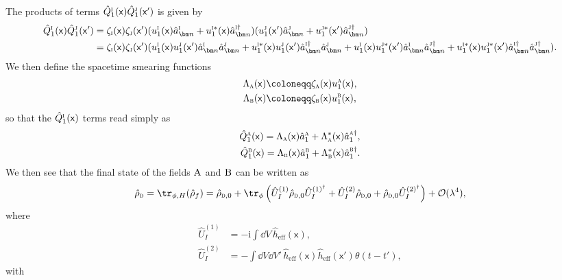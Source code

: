 \documentclass[letterpaper,12pt,titlepage,oneside,final]{book}
\newcommand{\mf}{\mathsf}%
\newcommand{\ii}{\mathrm{i}}
\newcommand{\tc}[1]{\textsc{#1}}
\begin{document}
{The products of terms $\hat{Q}_1^\tc{i}(\mf x)\hat{Q}_1^\tc{j}(\mf x')$ is given by
{\footnotesize
\begin{align}
    \hat{Q}_1^\tc{i}(\mf x)\hat{Q}_1^\tc{j}(\mf x') &= \zeta_{\tc{i}}(\mf x)\zeta_{\tc{j}}(\mf x') (u_1^\tc{i}(\mf x) \hat{a}_{\bm n}^\tc{i} + u_1^{\tc{i}*}(\mf x) \hat{a}_{\bm n}^{\tc{i}\dagger}) (u_1^\tc{j}(\mf x') \hat{a}_{\bm n}^\tc{j} + u_1^{\tc{j}*}(\mf x') \hat{a}_{\bm n}^{\tc{j}\dagger}) \\
    &= \zeta_{\tc{i}}(\mf x)\zeta_{\tc{j}}(\mf x') (u_1^\tc{i}(\mf x) u_1^\tc{j}(\mf x') \hat{a}_{\bm n}^\tc{i}\hat{a}_{\bm n}^\tc{j} + u_1^{\tc{i}*}(\mf x)u_1^\tc{j}(\mf x') \hat{a}_{\bm n}^{\tc{i}\dagger}\hat{a}_{\bm n}^\tc{j} + u_1^\tc{i}(\mf x)u_1^{\tc{j}*}(\mf x') \hat{a}_{\bm n}^\tc{i} \hat{a}_{\bm n}^{\tc{j}\dagger} + u_1^{\tc{i}*}(\mf x) u_1^{\tc{j}*}(\mf x') \hat{a}_{\bm n}^{\tc{i}\dagger}\hat{a}_{\bm n}^{\tc{j}\dagger}).\nonumber
\end{align}}
We then define the spacetime smearing functions
\begin{align}
    \Lambda_\tc{a}(\mf x) &\coloneqq \zeta_\tc{a}(\mf x) u^{\tc{a}}_1(\mf x),\\
    \Lambda_\tc{b}(\mf x) &\coloneqq \zeta_\tc{b}(\mf x) u^{\tc{b}}_1(\mf x),    
\end{align}
so that the $\hat{Q}_1^{\tc{i}}(\mf x)$ terms read simply as
\begin{align}
    \hat{Q}_1^{\tc{a}}(\mf x) = \Lambda_\tc{a}(\mf x) \hat{a}^{\tc{a}}_1+\Lambda^*_\tc{a}(\mf x) \hat{a}^{\tc{a}\dagger}_1,\\
    \hat{Q}_1^{\tc{b}}(\mf x) = \Lambda_\tc{b}(\mf x) \hat{a}^{\tc{b}}_1+\Lambda^*_\tc{b}(\mf x) \hat{a}^{\tc{b}\dagger}_1.
\end{align}
We then see that the final state of the fields $\tc{A}$ and $\tc{B}$ can be written as
\begin{align}
    \hat\rho_\tc{d} = \tr_{\phi,H}(\hat\rho_f) = \hat{\rho}_{\tc{d},0} + \tr_\phi\left(\hat{U}_I^{(1)} \hat{\rho}_{\tc{d},0}\hat{U}_I^{(1)^\dagger} + \hat{U}_I^{(2)} \hat{\rho}_{\tc{d},0}+ \hat{\rho}_{\tc{d},0}\hat{U}_I^{(2)^\dagger}\right) + \mathcal{O}(\lambda^4),
\end{align}
where
\begin{align}
    \hat{U}_I^{(1)} &= -\ii \int \dd V \, \hat{h}_\text{eff}(\mf x),\\
    \hat{U}_I^{(2)} &= -\int \dd V \dd V' \, \hat{h}_\text{eff}(\mf x)\hat{h}_\text{eff}(\mf x') \theta(t-t'),
\end{align}
with
}
\end{document}
